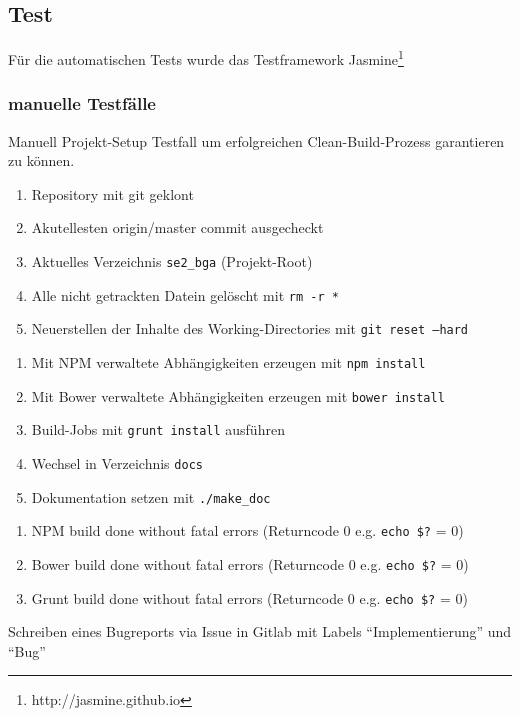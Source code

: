 \subsection{Test}
Für die automatischen Tests wurde das Testframework Jasmine\footnote{http://jasmine.github.io}
\subsubsection{manuelle Testfälle}
\begin{testcase}[tc:build]{Manuell}
\tcSubject Projekt-Setup
\tcRemark Testfall um erfolgreichen Clean-Build-Prozess garantieren zu können.
\tcConditions
	\begin{enumerate}
	\item Repository mit git geklont
	\item Akutellesten origin/master commit ausgecheckt
	\item Aktuelles Verzeichnis \texttt{se2\_bga} (Projekt-Root)
	\item Alle nicht getrackten Datein gelöscht mit \texttt{rm -r *}
	\item Neuerstellen der Inhalte des Working-Directories mit \texttt{git reset --hard}
	\end{enumerate}
\tcProceeding
	\begin{enumerate}
	\item Mit NPM verwaltete Abhängigkeiten erzeugen mit \texttt{npm install}
	\item Mit Bower verwaltete Abhängigkeiten erzeugen mit \texttt{bower install}
	\item Build-Jobs mit \texttt{grunt install} ausführen
	\item Wechsel in Verzeichnis \texttt{docs}
	\item Dokumentation setzen mit \texttt{./make\_doc}
	\end{enumerate}
\tcGoal
	\begin{enumerate}
	\item NPM build done without fatal errors (Returncode 0 e.g. \texttt{echo \$?} = 0)
	\item Bower build done without fatal errors (Returncode 0 e.g. \texttt{echo \$?} = 0)
	\item Grunt build done without fatal errors (Returncode 0 e.g. \texttt{echo \$?} = 0)
	\end{enumerate}
\tcError Schreiben eines Bugreports via Issue in Gitlab mit Labels "`Implementierung"' und "`Bug"'
\end{testcase}

